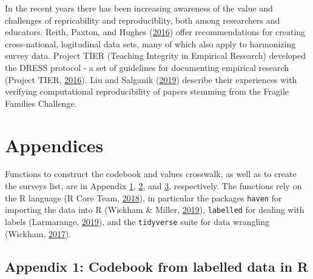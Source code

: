 \documentclass[12pt,]{article}
\begin{document}
In the recent years there has been increasing awareness of the value and challenges of repricability and reproduciblity, both among researchers and educators.
Reith, Paxton, and Hughes (\protect\hyperlink{ref-Reith2016}{2016}) offer recommendations for creating cross-national, logitudinal data sets, many of which also apply to harmonizing survey data. Project TIER (Teaching Integrity in Empirical Research) developed the DRESS protocol - a set of guidelines for documenting empirical research (Project TIER, \protect\hyperlink{ref-ProjectTIER2016}{2016}). Liu and Salganik (\protect\hyperlink{ref-Liu2019}{2019}) describe their experiences with verifying computational reproducibility of papers stemming from the Fragile Families Challenge.

\clearpage

\hypertarget{appendices}{%
\section{Appendices}\label{appendices}}

Functions to construct the codebook and values crosswalk, as well as to create the surveys list, are in Appendix \protect\hyperlink{appendix1}{1}, \protect\hyperlink{appendix2}{2}, and \protect\hyperlink{appendix3}{3}, respectively. The functions rely on the R language (R Core Team, \protect\hyperlink{ref-baser}{2018}), in particular the packages \texttt{haven} for importing the data into R (Wickham \& Miller, \protect\hyperlink{ref-haven}{2019}), \texttt{labelled} for dealing with labels (Larmarange, \protect\hyperlink{ref-labelled}{2019}), and the \texttt{tidyverse} suite for data wrangling (Wickham, \protect\hyperlink{ref-tidyverse}{2017}).

\hypertarget{appendix1}{%
\subsection{Appendix 1: Codebook from labelled data in R}\label{appendix1}}

\scriptsize
\end{document}
